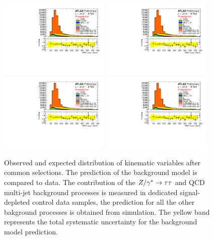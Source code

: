 \begin{figure}[p]
     \begin{center}
            \includegraphics[page=5,width=0.47\textwidth]{figure/std_plots_presel.pdf}
            \includegraphics[page=7,width=0.47\textwidth]{figure/std_plots_presel.pdf}
            \includegraphics[page=2,width=0.47\textwidth]{figure/std_plots_presel.pdf}
            \includegraphics[page=4,width=0.47\textwidth]{figure/std_plots_presel.pdf}

    \end{center}
    \caption{ Observed and expected distribution of  kinematic variables after common selections. 
	The prediction of the  background model is compared to  data.
	The contribution of the $Z/\gamma^*\rightarrow \tau\tau$ and QCD multi-jet background processes is measured in  dedicated  signal-depleted control data samples,
	the prediction for all the other bakground processes is obtained from simulation.
	The yellow band represents the total systematic uncertainty for the background model prediction.}
   \label{fig:validation}
\end{figure}



